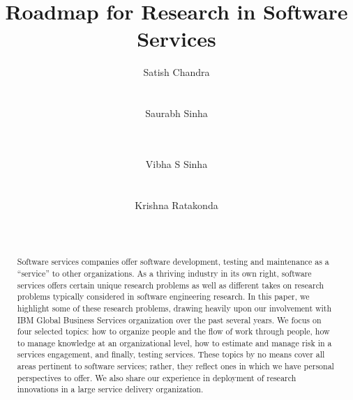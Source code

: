 \documentclass{sig-alternate}
\begin{document}
\title{Roadmap for Research in Software Services}


\author{
\alignauthor Satish Chandra\\
       \\
       \\
\alignauthor Saurabh Sinha\\
	\\
	\\
\and
\alignauthor Vibha S Sinha\\
	\\
	\\
\alignauthor Krishna Ratakonda\\
	\\
	\\
}

\maketitle

\begin{abstract}
Software services companies offer software development, testing and maintenance as a ``service'' to other organizations.  As a thriving industry in its own right, software services offers certain unique research problems as well as different takes on research problems typically considered in software engineering research. In this paper, we highlight some of these research problems, drawing heavily upon our involvement with IBM Global Business Services organization over the past several years.  We focus on four selected topics: how to organize people and the flow of work through people, how to manage knowledge at an organizational level, how to estimate and manage risk in a services engagement, and finally, testing services. These topics by no means cover all areas pertinent to software services; rather, they reflect ones in which we have personal perspectives to offer.  We also share our experience in deployment of  research innovations in a large service delivery organization.
\end{abstract}



\end{document}
